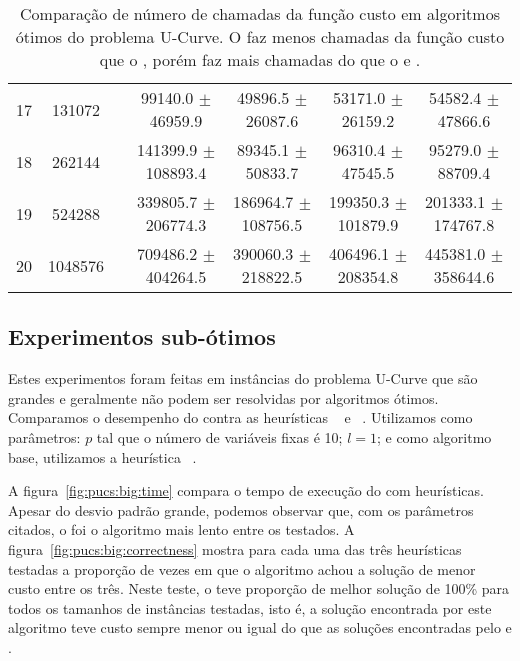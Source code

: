 \begin{table}
{\begin{tabular}{cc c cccc}
17 &  131072 && 99140.0 $\pm$ 46959.9 & 49896.5 $\pm$ 26087.6 & 53171.0 $\pm$ 26159.2 & 54582.4 $\pm$ 47866.6 \\
18 &  262144 && 141399.9 $\pm$ 108893.4 & 89345.1 $\pm$ 50833.7 & 96310.4 $\pm$ 47545.5 & 95279.0 $\pm$ 88709.4 \\
19 &  524288 && 339805.7 $\pm$ 206774.3 & 186964.7 $\pm$ 108756.5 & 199350.3 $\pm$ 101879.9 & 201333.1 $\pm$ 174767.8 \\
20 & 1048576 && 709486.2 $\pm$ 404264.5 & 390060.3 $\pm$ 218822.5 & 406496.1 $\pm$ 208354.8 & 445381.0 $\pm$ 358644.6 \\
\bottomrule
\end{tabular}
}
\caption{Comparação de número de chamadas da função custo em algoritmos
ótimos do problema U-Curve. O  faz menos chamadas da
função custo que o , porém faz mais chamadas do que o 
 e .}
\label{tab:pucs:small:cost}
\end{table}

\subsection{Experimentos sub-ótimos}
Estes experimentos foram feitas em instâncias do problema U-Curve que
são grandes e geralmente não podem ser resolvidas por algoritmos ótimos.
Comparamos o desempenho do  contra as heurísticas 
~\cite{PNK94} e ~\cite{KJ97}. Utilizamos
como parâmetros: $p$ tal que o número de variáveis fixas é 10; $l = 1$;
e como algoritmo base, utilizamos a heurística 
 ~\cite{Whi71}.

A figura~\ref{fig:pucs:big:time} compara o tempo de execução do 
 com heurísticas. Apesar do desvio padrão grande, podemos
observar que, com os parâmetros citados, o  foi o 
algoritmo mais lento entre os testados. A 
figura~\ref{fig:pucs:big:correctness} mostra para cada uma das três
heurísticas testadas a proporção de vezes em que o algoritmo achou a
solução de menor custo entre os três. Neste teste, o 
teve proporção de melhor solução de 100\% para todos os tamanhos
de instâncias testadas, isto é, a solução encontrada por este algoritmo
teve custo sempre menor ou igual do que as soluções encontradas
pelo  e .


